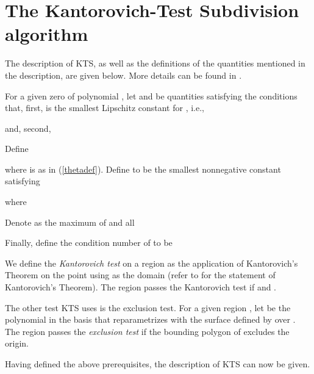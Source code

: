 \documentclass[12pt]{article}
\begin{document}
\section{The Kantorovich-Test Subdivision algorithm}

The description of KTS, as well as the definitions of
the quantities mentioned in the description, are given below.
More details can be found in \cite{srijuntongsiri_lsi}.

For a given zero  of polynomial ,
let  and 
be quantities satisfying the conditions that, first,  is the smallest Lipschitz constant
for , i.e.,

and, second,

Define

where  is as in (\ref{thetadef}).
Define  to be
the smallest nonnegative constant  satisfying

where

Denote  as the maximum of
 and all 

Finally, define the condition number of  to be


We define the \emph{Kantorovich test} on a region  as the application of Kantorovich's Theorem on
the point  using  as the
domain (refer to \cite{deuflhard, kantorovich} for the statement of
Kantorovich's Theorem).  The region  passes the Kantorovich
test if  and .

The other test KTS uses is the exclusion test. For a
given region , let  be the polynomial in the basis
 that reparametrizes with  the
surface defined by  over .  The region  passes the
\emph{exclusion test} if the bounding polygon of  excludes the origin.

Having defined the above prerequisites, the description of KTS
can now be given.
\end{document}
